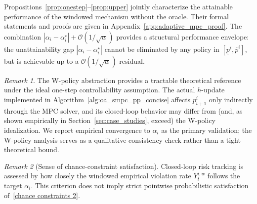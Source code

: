 \documentclass[a4paper,fleqn]{cas-dc}
\theoremstyle{plain}
\theoremstyle{remark}
\newtheorem{remark}{Remark}
\theoremstyle{plain}
\begin{document}
Propositions~\ref{prop:onestep}--\ref{prop:upper} jointly characterize the attainable performance of the windowed mechanism without the oracle. Their formal statements and proofs are given in Appendix~\ref{app:adaptive_mpc_proof}. The combination $|\alpha_i-\alpha_i^\star|+\mathcal{O}(1/\sqrt{w})$ provides a structural performance envelope: the unattainability gap $|\alpha_i-\alpha_i^\star|$ cannot be eliminated by any policy in $[\underline p^i,\overline p^i]$, but is achievable up to a $\mathcal{O}(1/\sqrt{w})$ residual.

\begin{remark}\label{rem:gap}
The W-policy abstraction provides a tractable theoretical reference under the ideal one-step controllability assumption. The actual $h$-update implemented in Algorithm~\ref{alg:oa_smpc_pp_concise} affects $p_{t+1}^i$ only indirectly through the MPC solver, and its closed-loop behavior may differ from (and, as shown empirically in Section~\ref{sec:case_studies}, exceed) the W-policy idealization. We report empirical convergence to $\alpha_i$ as the primary validation; the W-policy analysis serves as a qualitative consistency check rather than a tight theoretical bound.
\end{remark}

\begin{remark}[Sense of chance-constraint satisfaction]\label{rem:cc-sense}
Closed-loop risk tracking is assessed by how closely the windowed empirical violation rate $Y_t^{i,w}$ follows the target $\alpha_i$. This criterion does not imply strict pointwise probabilistic satisfaction of~\eqref{chance constraints 2}.
\end{remark}
\end{document}
